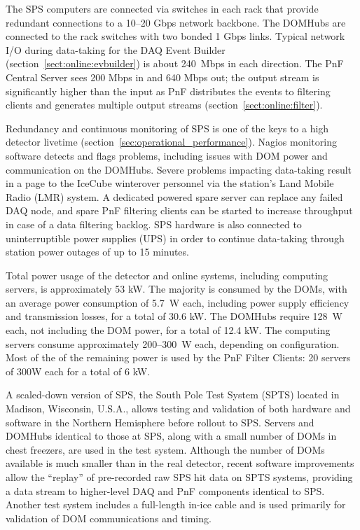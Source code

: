 The SPS computers are connected via switches in each rack that provide
redundant connections to a 10--20 Gbps network backbone.  The DOMHubs are
connected to the rack switches with two bonded 1 Gbps links.  Typical network I/O during
data-taking for the DAQ Event Builder (section~\ref{sect:online:evbuilder}) is about 240~Mbps in each direction.
The PnF Central Server sees 200 Mbps in and 640 Mbps out; the output
stream is significantly higher than the input as PnF distributes the
events to filtering clients and generates multiple output streams
(section~\ref{sect:online:filter}).  

Redundancy and continuous monitoring of SPS is one of the keys to a high
detector livetime (section~\ref{sec:operational_performance}).
Nagios monitoring software detects and flags problems, 
including issues with DOM power and communication on the DOMHubs.  Severe
problems impacting data-taking result in a page to the IceCube winterover 
personnel via the station's Land Mobile Radio (LMR) system.  A dedicated
powered spare server can replace any failed DAQ node, and spare PnF filtering
clients can be started to increase throughput in case of a data filtering
backlog.  SPS hardware is also connected to uninterruptible
power supplies (UPS) in order to continue data-taking through station power
outages of up to 15 minutes.

Total power usage of the detector and online systems, including computing servers, is
approximately 53 kW.  The majority is consumed by the DOMs, with an
average power consumption of 5.7~W each, including power supply efficiency
and transmission losses, for a total of 30.6 kW.  The DOMHubs require 128~W
each, not including the DOM power, for a total of 12.4 kW.  The
computing servers consume approximately 200--300~W each, depending on
configuration.  Most of the of the remaining power is used by the PnF
Filter Clients: 20 servers of 300W each for a total of 6 kW.

A scaled-down version of SPS, the South Pole Test System (SPTS) located in
Madison, Wisconsin, U.S.A., allows testing and validation of both hardware
and software in the Northern Hemisphere before rollout to SPS.  Servers and DOMHubs
identical to those at SPS, along with a small number of DOMs in chest
freezers, are used in the test system.  Although the number of DOMs
available is much smaller than in the real detector, recent software
improvements allow the ``replay'' of pre-recorded raw SPS hit data
on SPTS systems, providing a data stream to higher-level DAQ and PnF
components identical to SPS.  Another test system includes a full-length
in-ice cable and is used primarily for validation of DOM communications and
timing.

